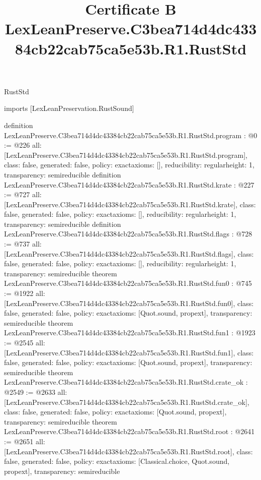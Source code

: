 \begin{lexlean}{RustStd}
\title{Certificate B LexLeanPreserve.C3bea714d4dc43384cb22cab75ca5e53b.R1.RustStd}
\begin{coremodule}
imports [LexLeanPreservation.RustSound]

definition LexLeanPreserve.C3bea714d4dc43384cb22cab75ca5e53b.R1.RustStd.program : @0 := @226 {
  all: [LexLeanPreserve.C3bea714d4dc43384cb22cab75ca5e53b.R1.RustStd.program],
  class: false,
  generated: false,
  policy: exact{axioms: []},
  reducibility: regular{height: 1},
  transparency: semireducible
}
definition LexLeanPreserve.C3bea714d4dc43384cb22cab75ca5e53b.R1.RustStd.krate : @227 := @727 {
  all: [LexLeanPreserve.C3bea714d4dc43384cb22cab75ca5e53b.R1.RustStd.krate],
  class: false,
  generated: false,
  policy: exact{axioms: []},
  reducibility: regular{height: 1},
  transparency: semireducible
}
definition LexLeanPreserve.C3bea714d4dc43384cb22cab75ca5e53b.R1.RustStd.flags : @728 := @737 {
  all: [LexLeanPreserve.C3bea714d4dc43384cb22cab75ca5e53b.R1.RustStd.flags],
  class: false,
  generated: false,
  policy: exact{axioms: []},
  reducibility: regular{height: 1},
  transparency: semireducible
}
theorem LexLeanPreserve.C3bea714d4dc43384cb22cab75ca5e53b.R1.RustStd.fun0 : @745 := @1922 {
  all: [LexLeanPreserve.C3bea714d4dc43384cb22cab75ca5e53b.R1.RustStd.fun0],
  class: false,
  generated: false,
  policy: exact{axioms: [Quot.sound, propext]},
  transparency: semireducible
}
theorem LexLeanPreserve.C3bea714d4dc43384cb22cab75ca5e53b.R1.RustStd.fun1 : @1923 := @2545 {
  all: [LexLeanPreserve.C3bea714d4dc43384cb22cab75ca5e53b.R1.RustStd.fun1],
  class: false,
  generated: false,
  policy: exact{axioms: [Quot.sound, propext]},
  transparency: semireducible
}
theorem LexLeanPreserve.C3bea714d4dc43384cb22cab75ca5e53b.R1.RustStd.crate_ok : @2549 := @2633 {
  all: [LexLeanPreserve.C3bea714d4dc43384cb22cab75ca5e53b.R1.RustStd.crate_ok],
  class: false,
  generated: false,
  policy: exact{axioms: [Quot.sound, propext]},
  transparency: semireducible
}
theorem LexLeanPreserve.C3bea714d4dc43384cb22cab75ca5e53b.R1.RustStd.root : @2641 := @2651 {
  all: [LexLeanPreserve.C3bea714d4dc43384cb22cab75ca5e53b.R1.RustStd.root],
  class: false,
  generated: false,
  policy: exact{axioms: [Classical.choice, Quot.sound, propext]},
  transparency: semireducible
}


\end{coremodule}
\end{lexlean}
